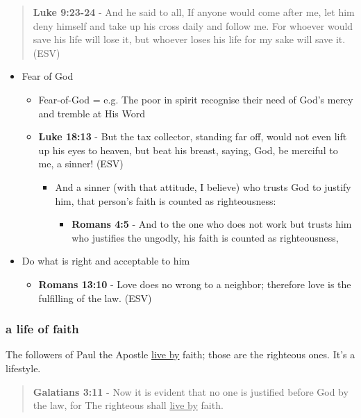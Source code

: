 \documentclass[11pt]{article}
\begin{document}
\begin{quote}
\textbf{Luke 9:23-24} - And he said to all, If anyone would come after me, let him deny himself and take up his cross daily and follow me. For whoever would save his life will lose it, but whoever loses his life for my sake will save it. (ESV)
\end{quote}

\begin{itemize}
\item Fear of God
\begin{itemize}
\item Fear-of-God = e.g. The poor in spirit recognise their need of God's mercy and tremble at His Word
\item \textbf{Luke 18:13} - But the tax collector, standing far off, would not even lift up his eyes to heaven, but beat his breast, saying, God, be merciful to me, a sinner! (ESV)
\begin{itemize}
\item And a sinner (with that attitude, I believe) who trusts God to justify him, that person's faith is counted as righteousness:
\begin{itemize}
\item \textbf{Romans 4:5} - And to the one who does not work but trusts him who justifies the ungodly, his faith is counted as righteousness,
\end{itemize}
\end{itemize}
\end{itemize}
\item Do what is right and acceptable to him
\begin{itemize}
\item \textbf{Romans 13:10} - Love does no wrong to a neighbor; therefore love is the fulfilling of the law. (ESV)
\end{itemize}
\end{itemize}

\subsubsection{a life of faith}
\label{sec:orgd8d6b97}
The followers of Paul the Apostle \uline{live by} faith; those are the righteous ones. It's a lifestyle.

\begin{quote}
\textbf{Galatians 3:11} - Now it is evident that no one is justified before God by the law, for The righteous shall \uline{live by} faith.
\end{quote}
\end{document}
